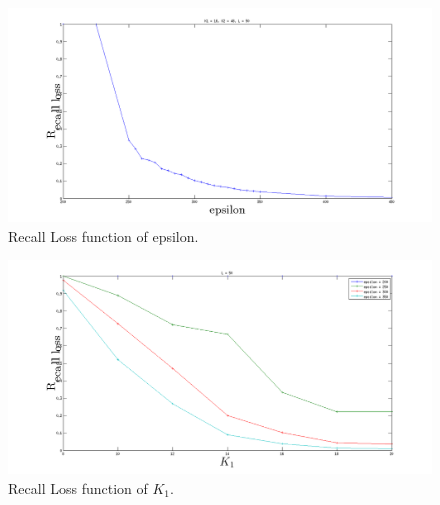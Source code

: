 \documentclass[english]{beamer}
\theoremstyle{plain}
\theoremstyle{remark}
\begin{document}
\begin{frame}

\begin{figure}[htbp]
	\begin{center}
	\includegraphics[width=.8\linewidth]{Images/rloss.png}
	\end{center}
	\caption{Recall Loss function of epsilon.}
	\label{fig:rloss}
\end{figure}

\end{frame}
\begin{frame}

\begin{figure}[htbp]
	\begin{center}
	\includegraphics[width=.8\linewidth]{Images/k1_rloss.png}
	\end{center}
	\caption{Recall Loss function of $K_1$.}
	\label{fig:rloss}
\end{figure}

\end{frame}

\end{document}
